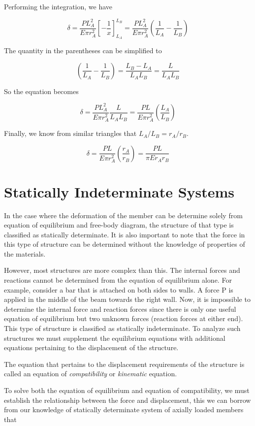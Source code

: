 \documentclass[
10pt,
a4paper,
openany,
svgnames,
]{book} %
\begin{document}
\begin{solution}
Performing the integration, we have

\[\delta  = \frac{PL_A^2}{E\pi r_A^2}\left[ - \frac{1}{x} \right]_{L_A}^{L_B} = \frac{PL_A^2}{E\pi r_A^2}\left( \frac{1}{L_A} - \frac{1}{L_B} \right)\]	

The quantity in the parentheses can be simplified to

\[\left( \frac{1}{L_A} - \frac{1}{L_B} \right) = \frac{L_B - L_A}{L_AL_B} = \frac{L}{L_AL_B}\]	

So the equation becomes

\[\delta  = \frac{PL_A^2}{E\pi r_A^2}\frac{L}{L_AL_B} = \frac{PL}{E\pi r_A^2}\left( \frac{L_A}{L_B} \right)\]	

Finally, we know from similar triangles that $L_A/L_B = r_A/r_B$.

\[\delta  = \frac{PL}{E\pi r_A^2}\left( \frac{r_A}{r_B} \right) = \frac{PL}{\pi Er_Ar_B}\]

\end{solution}

\section{Statically Indeterminate Systems}

In the case where the deformation of the member can be determine solely from equation of equilibrium and free-body diagram, the structure of that type is classified as statically determinate. It is also important to note that the force in this type of structure can be determined without the knowledge of properties of the materials.

However, most structures are more complex than this. The internal forces and reactions cannot be determined from the equation of equilibrium alone. For example, consider a bar that is attached on both sides to walls. A force P is applied in the middle of the beam towards the right wall. Now, it is impossible to determine the internal force and reaction forces since there is only one useful equation of equilibrium but two unknown forces (reaction forces at either end). This type of structure is classified as statically indeterminate. To analyze such structures we must supplement the equilibrium equations with additional equations pertaining to the displacement of the structure.

The equation that pertains to the displacement requirements of the structure is called an equation of \emph{compatibility} or \emph{kinematic} equation.

To solve both the equation of equilibrium and equation of compatibility, we must establish the relationship between the force and displacement, this we can borrow from our knowledge of statically determinate system of axially loaded members that
	
\end{document}
